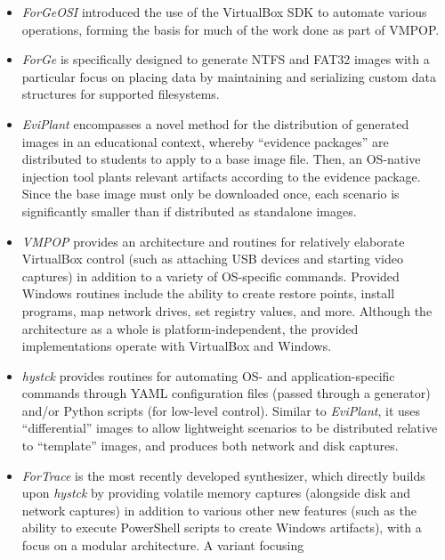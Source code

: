 \begin{itemize}
\item
  \emph{ForGeOSI} \cite{maxfraggMaxfraggForGeOSI2023} introduced the
  use of the VirtualBox SDK to automate various operations, forming the
  basis for much of the work done as part of VMPOP.
\item
  \emph{ForGe} \cite{vistiAutomaticCreationComputer2015} is
  specifically designed to generate NTFS and FAT32 images with a
  particular focus on placing data by maintaining and serializing custom
  data structures for supported filesystems.
\item
  \emph{EviPlant} \cite{scanlonEviPlantEfficientDigital2017}
  encompasses a novel method for the distribution of generated images in
  an educational context, whereby ``evidence packages'' are distributed
  to students to apply to a base image file. Then, an OS-native
  injection tool plants relevant artifacts according to the evidence
  package. Since the base image must only be downloaded once, each
  scenario is significantly smaller than if distributed as standalone
  images.
\item
  \emph{VMPOP} \cite{parkTREDEVMPOPCultivating2018} provides an
  architecture and routines for relatively elaborate VirtualBox control
  (such as attaching USB devices and starting video captures) in
  addition to a variety of OS-specific commands. Provided Windows
  routines include the ability to create restore points, install
  programs, map network drives, set registry values, and more. Although
  the architecture as a whole is platform-independent, the provided
  implementations operate with VirtualBox and Windows.
\item
  \emph{hystck} \cite{gobelNovelApproachGenerating2020} provides
  routines for automating OS- and application-specific commands through
  YAML configuration files (passed through a generator) and/or Python
  scripts (for low-level control). Similar to \emph{EviPlant}, it uses
  ``differential'' images to allow lightweight scenarios to be
  distributed relative to ``template'' images, and produces both network
  and disk captures.
\item
  \emph{ForTrace} \cite{gobelForTraceHolisticForensic2022} is the
  most recently developed synthesizer, which directly builds upon
  \emph{hystck} by providing volatile memory captures (alongside disk
  and network captures) in addition to various other new features (such
  as the ability to execute PowerShell scripts to create Windows
  artifacts), with a focus on a modular architecture. A variant focusing

\end{itemize}
